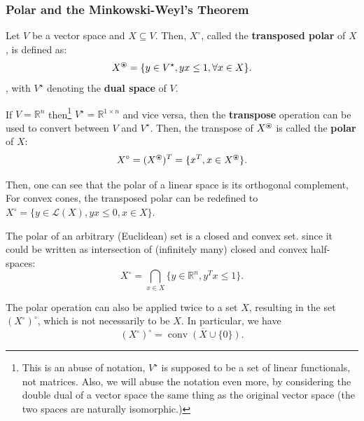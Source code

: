 \iffalse
\subsubsection{Polar and the Minkowski-Weyl's Theorem} %
\label{sec:Polar and the Minkowski-Weyl's Theorem}

\begin{definition}[Polar]
\label{def:Polar}
  Let \( V \) be a vector space and \( X \subseteq V \). Then,
  \( X^{\circ} \), called the \textbf{transposed polar} of \( X \), is defined as:
  \[
    X^{\ostar} = \{y \in V^{\star}, yx \le 1, \forall x \in X \}  
  .\], with \( V^{\star} \) denoting the \textbf{dual space} of \( V \).

  If \( V = \mathbb{R}^{n} \) then\footnote{This is an abuse of notation, \(
  V^{\star} \) is supposed to be a set of linear functionals, not matrices.
Also, we will abuse the notation even more, by considering the double dual of a
vector space the same thing as the original vector space (the two spaces are
naturally isomorphic.)}
  \( V^{\star} = \mathbb{R}^{1\times n} \) and
  vice versa, then the \textbf{transpose} operation can be used to convert
  between \( V \) and \( V^{\star} \). Then,
  the transpose of \( X^{\ostar} \) is called the \textbf{polar} of \( X \):
  \[
    X^{\circ} = (X^{\ostar})^{T} = \{x^{T}, x \in X^{\ostar}\}   
  .\] 
\end{definition}

Then, one can see that the polar of a linear space is its orthogonal complement,
For convex cones, the transposed polar can be redefined to \( X^{\circ} = \{y \in
\mathcal{L}(X), yx \le  0, x \in X\}   \).

The polar of an arbitrary (Euclidean) set is a closed and convex set.
since it could be written as intersection of (infinitely many) closed and convex
half-spaces:
\[
  X^{\circ} = \bigcap_{x \in X} \{y \in \mathbb{R}^{n}, y^{T}x \le  1\}  
.\] 

The polar operation can also be applied twice to a set \( X \), resulting in the
set \( (X^{\circ})^{\circ} \), which is not necessarily to be \( X \). In
particular, we have
\[
  (X^{\circ})^{\circ} = \overline{\operatorname{conv} (X \cup  \{0\}  )} 
.\] 

